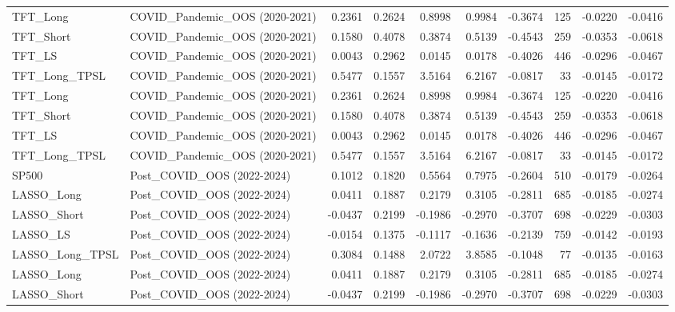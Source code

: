 \begin{tabular}{llrrrrrrrr}
\cline{1-10}
TFT\_Long & COVID\_Pandemic\_OOS (2020-2021) & 0.2361 & 0.2624 & 0.8998 & 0.9984 & -0.3674 & 125 & -0.0220 & -0.0416 \\
\cline{1-10}
TFT\_Short & COVID\_Pandemic\_OOS (2020-2021) & 0.1580 & 0.4078 & 0.3874 & 0.5139 & -0.4543 & 259 & -0.0353 & -0.0618 \\
\cline{1-10}
TFT\_LS & COVID\_Pandemic\_OOS (2020-2021) & 0.0043 & 0.2962 & 0.0145 & 0.0178 & -0.4026 & 446 & -0.0296 & -0.0467 \\
\cline{1-10}
TFT\_Long\_TPSL & COVID\_Pandemic\_OOS (2020-2021) & 0.5477 & 0.1557 & 3.5164 & 6.2167 & -0.0817 & 33 & -0.0145 & -0.0172 \\
\cline{1-10}
TFT\_Long & COVID\_Pandemic\_OOS (2020-2021) & 0.2361 & 0.2624 & 0.8998 & 0.9984 & -0.3674 & 125 & -0.0220 & -0.0416 \\
\cline{1-10}
TFT\_Short & COVID\_Pandemic\_OOS (2020-2021) & 0.1580 & 0.4078 & 0.3874 & 0.5139 & -0.4543 & 259 & -0.0353 & -0.0618 \\
\cline{1-10}
TFT\_LS & COVID\_Pandemic\_OOS (2020-2021) & 0.0043 & 0.2962 & 0.0145 & 0.0178 & -0.4026 & 446 & -0.0296 & -0.0467 \\
\cline{1-10}
TFT\_Long\_TPSL & COVID\_Pandemic\_OOS (2020-2021) & 0.5477 & 0.1557 & 3.5164 & 6.2167 & -0.0817 & 33 & -0.0145 & -0.0172 \\
\cline{1-10}
SP500 & Post\_COVID\_OOS (2022-2024) & 0.1012 & 0.1820 & 0.5564 & 0.7975 & -0.2604 & 510 & -0.0179 & -0.0264 \\
\cline{1-10}
LASSO\_Long & Post\_COVID\_OOS (2022-2024) & 0.0411 & 0.1887 & 0.2179 & 0.3105 & -0.2811 & 685 & -0.0185 & -0.0274 \\
\cline{1-10}
LASSO\_Short & Post\_COVID\_OOS (2022-2024) & -0.0437 & 0.2199 & -0.1986 & -0.2970 & -0.3707 & 698 & -0.0229 & -0.0303 \\
\cline{1-10}
LASSO\_LS & Post\_COVID\_OOS (2022-2024) & -0.0154 & 0.1375 & -0.1117 & -0.1636 & -0.2139 & 759 & -0.0142 & -0.0193 \\
\cline{1-10}
LASSO\_Long\_TPSL & Post\_COVID\_OOS (2022-2024) & 0.3084 & 0.1488 & 2.0722 & 3.8585 & -0.1048 & 77 & -0.0135 & -0.0163 \\
\cline{1-10}
LASSO\_Long & Post\_COVID\_OOS (2022-2024) & 0.0411 & 0.1887 & 0.2179 & 0.3105 & -0.2811 & 685 & -0.0185 & -0.0274 \\
\cline{1-10}
LASSO\_Short & Post\_COVID\_OOS (2022-2024) & -0.0437 & 0.2199 & -0.1986 & -0.2970 & -0.3707 & 698 & -0.0229 & -0.0303 \\
\cline{1-10}

\end{tabular}
